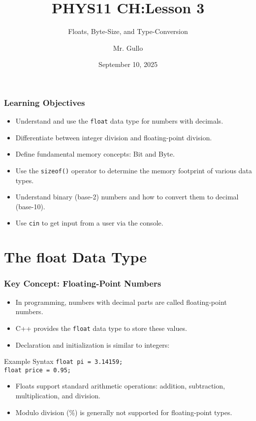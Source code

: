 \documentclass{beamer}
\title[Floats and Memory]{PHYS11 CH:Lesson 3}
\subtitle{Floats, Byte-Size, and Type-Conversion}
\author[Mr. Gullo]{Mr. Gullo}
\date[Sep 10, 2025]{September 10, 2025}
\begin{document}
\frame{\titlepage}

\begin{frame}
\frametitle{Learning Objectives}
\begin{itemize}
    \item Understand and use the \texttt{float} data type for numbers with decimals.
    \item Differentiate between integer division and floating-point division.
    \item Define fundamental memory concepts: Bit and Byte.
    \item Use the \texttt{sizeof()} operator to determine the memory footprint of various data types.
    \item Understand binary (base-2) numbers and how to convert them to decimal (base-10).
    \item Use \texttt{cin} to get input from a user via the console.
\end{itemize}
\end{frame}

\section{The float Data Type}

\begin{frame}
\frametitle{Key Concept: Floating-Point Numbers}
\begin{itemize}
    \item In programming, numbers with decimal parts are called \alert{floating-point numbers}.
    \item C++ provides the \texttt{float} data type to store these values.
    \item Declaration and initialization is similar to integers:
\end{itemize}
\begin{block}{Example Syntax}
\texttt{float pi = 3.14159;} \\
\texttt{float price = 0.95;}
\end{block}
\begin{itemize}
    \item Floats support standard arithmetic operations: addition, subtraction, multiplication, and division.
    \item \alert{Modulo division (\%)} is generally not supported for floating-point types.
\end{itemize}
\end{frame}
\end{document}
